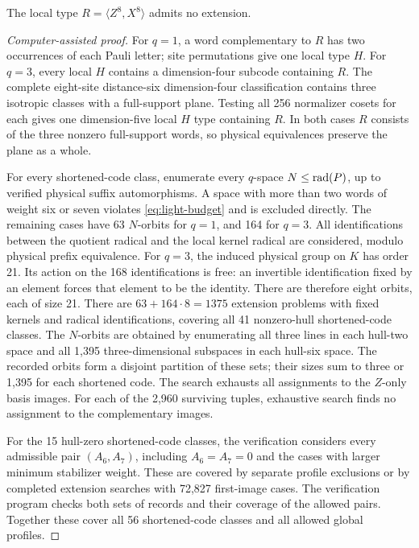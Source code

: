\begin{proposition}\label{prop:17-plane}
The local type \(R=\langle Z^8,X^8\rangle\) admits no extension.
\end{proposition}
\begin{proof}[Computer-assisted proof]
For \(q=1\), a word complementary to \(R\) has two occurrences of
each Pauli letter; site permutations give one local type \(H\).
For \(q=3\), every local \(H\) contains a dimension-four subcode
containing \(R\). The complete eight-site distance-six dimension-four
classification contains three isotropic classes with a full-support plane.
Testing all 256 normalizer cosets for each gives one dimension-five
local \(H\) type containing \(R\). In both cases \(R\) consists of
the three nonzero full-support words, so physical equivalences preserve
the plane as a whole.

For every shortened-code class, enumerate every \(q\)-space
\(N\leq\operatorname{rad}(P)\), up to verified physical suffix automorphisms.
A space with more than two words of weight six or seven violates
\eqref{eq:light-budget} and is excluded directly. The remaining cases
have 63 \(N\)-orbits for \(q=1\), and 164 for \(q=3\).
All identifications between the quotient radical and the local kernel
radical are considered, modulo physical prefix equivalence. For \(q=3\),
the induced physical group on \(K\) has order 21. Its action on
the 168 identifications is free: an invertible identification fixed by
an element forces that element to be the identity. There are therefore
eight orbits, each of size 21. There are \(63+164\cdot8=1375\) extension problems with fixed
kernels and radical identifications, covering all 41 nonzero-hull
shortened-code classes. The \(N\)-orbits are obtained by enumerating all three lines
in each hull-two space and all 1,395 three-dimensional subspaces in each
hull-six space. The recorded orbits form a disjoint partition of these
sets; their sizes sum to three or 1,395 for each shortened code.
The search exhausts all assignments to the \(Z\)-only basis images.
For each of the 2,960 surviving tuples, exhaustive search finds no
assignment to the complementary images.

For the 15 hull-zero shortened-code classes, the verification considers
every admissible pair \((A_6,A_7)\), including \(A_6=A_7=0\) and the
cases with larger minimum stabilizer weight. These are covered by
separate profile exclusions or by completed extension searches with
72,827 first-image cases. The verification program checks both sets of
records and their coverage of the allowed pairs. Together these cover all
56 shortened-code classes and all allowed global profiles.
\end{proof}

